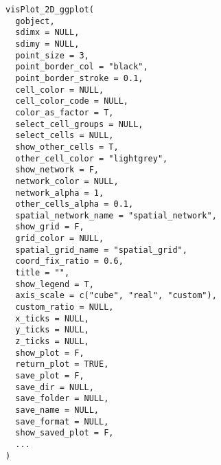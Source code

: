\documentclass[a4paper]{book}
\begin{document}
\begin{Usage}
\begin{verbatim}
visPlot_2D_ggplot(
  gobject,
  sdimx = NULL,
  sdimy = NULL,
  point_size = 3,
  point_border_col = "black",
  point_border_stroke = 0.1,
  cell_color = NULL,
  cell_color_code = NULL,
  color_as_factor = T,
  select_cell_groups = NULL,
  select_cells = NULL,
  show_other_cells = T,
  other_cell_color = "lightgrey",
  show_network = F,
  network_color = NULL,
  network_alpha = 1,
  other_cells_alpha = 0.1,
  spatial_network_name = "spatial_network",
  show_grid = F,
  grid_color = NULL,
  spatial_grid_name = "spatial_grid",
  coord_fix_ratio = 0.6,
  title = "",
  show_legend = T,
  axis_scale = c("cube", "real", "custom"),
  custom_ratio = NULL,
  x_ticks = NULL,
  y_ticks = NULL,
  z_ticks = NULL,
  show_plot = F,
  return_plot = TRUE,
  save_plot = F,
  save_dir = NULL,
  save_folder = NULL,
  save_name = NULL,
  save_format = NULL,
  show_saved_plot = F,
  ...
)
\end{verbatim}
\end{Usage}
%
\end{document}
